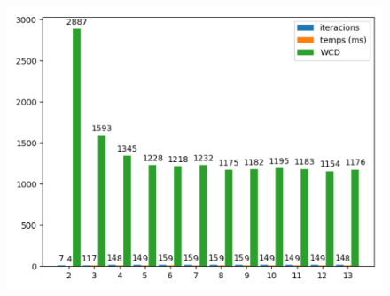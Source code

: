 \documentclass[a4paper, 11pt]{article}
\begin{document}
\begin{figure}[h]
\begin{minipage}{.3\textwidth}
  \includegraphics[width=.9\linewidth]{rnd_barras.png}
\end{minipage}
\end{figure}



\newpage
\end{document}
